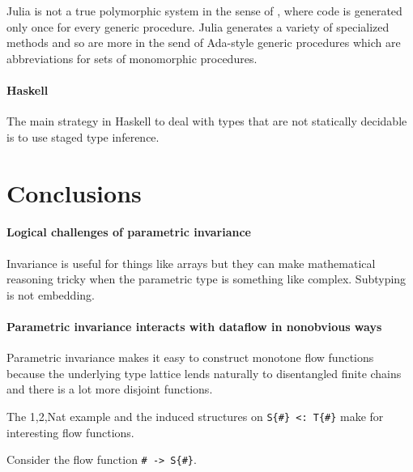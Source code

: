 \documentclass[pldi]{sigplanconf-pldi15}
\begin{document}
Julia is not a true polymorphic system in the sense of \cite{Cardelli1985},
where code is generated only once for every generic procedure. Julia generates
a variety of specialized methods and so are more in the send of Ada-style
generic procedures which are abbreviations for sets of monomorphic procedures.


\paragraph{Haskell}

The main strategy in Haskell to deal with types that are not statically
decidable is to use staged type inference.~\cite{Shields1998}


\section{Conclusions}

\paragraph{Logical challenges of parametric invariance}
Invariance is useful for things like arrays but they can make mathematical
reasoning tricky when the parametric type is something like complex.  Subtyping
is not embedding.

\paragraph{Parametric invariance interacts with dataflow in nonobvious ways}
Parametric invariance makes it easy to construct monotone flow functions
because the underlying type lattice lends naturally to disentangled finite
chains and there is a lot more disjoint functions.

The 1,2,Nat example and the induced structures on \verb|S{#} <: T{#}| make for
interesting flow functions.

Consider the flow function \verb|# -> S{#}|.
\end{document}

